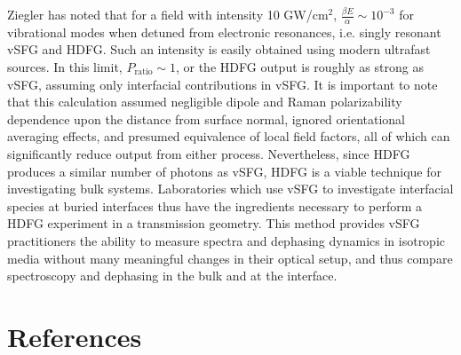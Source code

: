 \documentclass[aip, jcp, reprint, onecolumn, nofootinbib]{revtex4-2}
\begin{document}
Ziegler has noted that for a field with intensity 10 GW/cm$^{2}$, $\frac{\beta E}{\alpha} \sim 10^{-3} $ for vibrational modes when detuned from electronic resonances, i.e. singly resonant vSFG and HDFG. \cite{RN515}
Such an intensity is easily obtained using modern ultrafast sources.
In this limit, $P_\text{ratio} \sim 1$, or the HDFG output is roughly as strong as vSFG, assuming only interfacial contributions in vSFG.
It is important to note that this calculation assumed negligible dipole and Raman polarizability dependence upon the distance from surface normal, ignored orientational averaging effects, and presumed equivalence of local field factors, all of which can significantly reduce output from either process. 
Nevertheless, since HDFG produces a similar number of photons as vSFG, HDFG is a viable technique for investigating bulk systems.
Laboratories which use vSFG to investigate interfacial species at buried interfaces thus have the ingredients necessary to perform a HDFG experiment in a transmission geometry. \cite{Piontek2023_1}
This method provides vSFG practitioners the ability to measure spectra and dephasing dynamics in isotropic media without many meaningful changes in their optical setup, and thus compare spectroscopy and dephasing in the bulk and at the interface.\cite{RN224}



\section{References}

\end{document}
